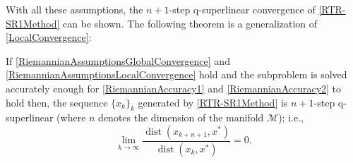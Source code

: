 With all these assumptions, the $n + 1$-step q-superlinear convergence of \cref{RTR-SR1Method} can be shown. The following theorem is a generalization of \cref{LocalConvergence}:
\begin{theorem} \label{RiemannianLocalConvergence}
    If \cref{RiemannianAssumptionsGlobalConvergence} and \cref{RiemannianAssumptionsLocalConvergence} hold and the subproblem is solved accurately enough for \cref{RiemannianAccuracy1} and \cref{RiemannianAccuracy2} to hold then, the sequence $\{ x_k \}_k$ generated by \cref{RTR-SR1Method} is $n + 1$-step q-superlinear (where $n$ denotes the dimension of the manifold $\mathcal{M}$); i.e.,
    \begin{equation}
        \lim_{k \rightarrow \infty} \frac{\operatorname{dist}(x_{k+n+1}, x^*)}{\operatorname{dist}(x_k, x^*)} = 0.
    \end{equation}
\end{theorem}


